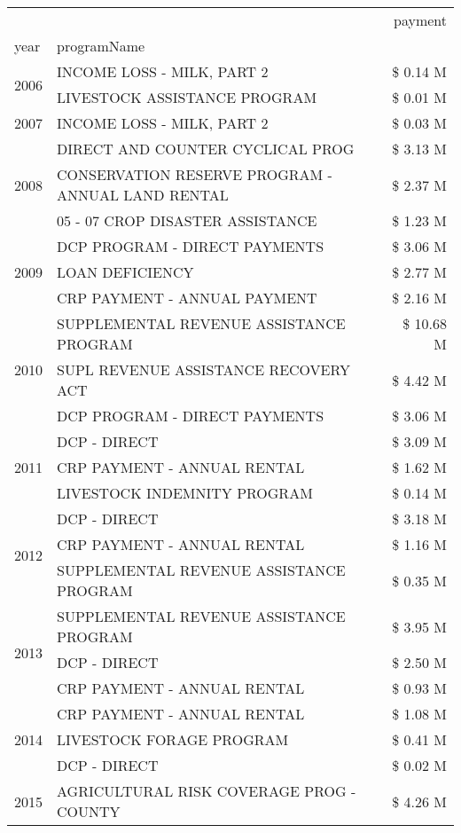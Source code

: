 \begin{tabular}{llr}
\toprule
 &  & payment \\
year & programName &  \\
\midrule
\multirow[t]{2}{*}{2006} & INCOME LOSS - MILK, PART 2 & \$ 0.14 M \\
 & LIVESTOCK ASSISTANCE PROGRAM & \$ 0.01 M \\
\cline{1-3}
2007 & INCOME LOSS - MILK, PART 2 & \$ 0.03 M \\
\cline{1-3}
\multirow[t]{3}{*}{2008} & DIRECT AND COUNTER CYCLICAL PROG & \$ 3.13 M \\
 & CONSERVATION RESERVE PROGRAM - ANNUAL LAND RENTAL & \$ 2.37 M \\
 & 05 - 07 CROP DISASTER ASSISTANCE & \$ 1.23 M \\
\cline{1-3}
\multirow[t]{3}{*}{2009} & DCP PROGRAM - DIRECT PAYMENTS & \$ 3.06 M \\
 & LOAN DEFICIENCY & \$ 2.77 M \\
 & CRP PAYMENT - ANNUAL PAYMENT & \$ 2.16 M \\
\cline{1-3}
\multirow[t]{3}{*}{2010} & SUPPLEMENTAL REVENUE ASSISTANCE PROGRAM & \$ 10.68 M \\
 & SUPL REVENUE ASSISTANCE RECOVERY ACT & \$ 4.42 M \\
 & DCP PROGRAM - DIRECT PAYMENTS & \$ 3.06 M \\
\cline{1-3}
\multirow[t]{3}{*}{2011} & DCP - DIRECT & \$ 3.09 M \\
 & CRP PAYMENT - ANNUAL RENTAL & \$ 1.62 M \\
 & LIVESTOCK INDEMNITY PROGRAM & \$ 0.14 M \\
\cline{1-3}
\multirow[t]{3}{*}{2012} & DCP - DIRECT & \$ 3.18 M \\
 & CRP PAYMENT - ANNUAL RENTAL & \$ 1.16 M \\
 & SUPPLEMENTAL REVENUE ASSISTANCE PROGRAM & \$ 0.35 M \\
\cline{1-3}
\multirow[t]{3}{*}{2013} & SUPPLEMENTAL REVENUE ASSISTANCE PROGRAM & \$ 3.95 M \\
 & DCP - DIRECT & \$ 2.50 M \\
 & CRP PAYMENT - ANNUAL RENTAL & \$ 0.93 M \\
\cline{1-3}
\multirow[t]{3}{*}{2014} & CRP PAYMENT - ANNUAL RENTAL & \$ 1.08 M \\
 & LIVESTOCK FORAGE PROGRAM & \$ 0.41 M \\
 & DCP - DIRECT & \$ 0.02 M \\
\cline{1-3}
\multirow[t]{3}{*}{2015} & AGRICULTURAL RISK COVERAGE PROG - COUNTY & \$ 4.26 M \\

\end{tabular}
